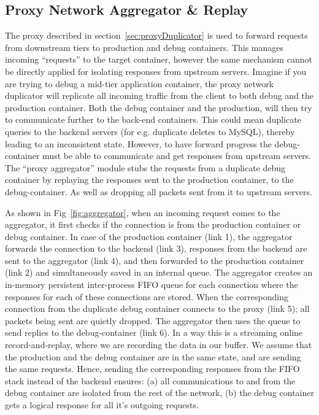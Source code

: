 

\subsection{Proxy Network Aggregator \& Replay }
\label{sec:proxyAggregator}
The proxy described in section~\ref{sec:proxyDuplicator} is used to forward requests from downstream tiers to production and debug containers.
This manages incoming ``requests'' to the target container, however the same mechanism cannot be directly applied for isolating responses from upstream servers.
Imagine if you are trying to debug a mid-tier application container, the proxy network duplicator will replicate all incoming traffic from the client to both debug and the production container. 
Both the debug container and the production, will then try to communicate further to the back-end containers.
This could mean duplicate queries to the backend servers (for e.g. duplicate deletes to MySQL), thereby leading to an inconsistent state.
However, to have forward progress the debug-container must be able to communicate and get responses from upstream servers.
The ``proxy aggregator'' module stubs the requests from a duplicate debug container by replaying the responses sent to the production container, to the debug-container.
As well as dropping all packets sent from it to upstream servers.

As shown in  Fig~\ref{fig:aggregator}, when an incoming request comes to the aggregator, it first checks if the connection is from the production container or debug container. 
In case of the production container (link 1), the aggregator forwards the connection to the backend (link 3), responses from the backend are sent to the aggregator (link 4), and then forwarded to the production container (link 2) and simultaneously saved in an internal queue.
The aggregator creates an in-memory persistent inter-process FIFO queue for each connection where the responses for each of these connections are stored.
When the corresponding connection from the duplicate debug container connects to the proxy (link 5); all packets being sent are quietly dropped. 
The aggregator then uses the queue to send replies to the debug-container (link 6).
In a way this is a streaming online record-and-replay, where we are recording the data in our buffer.
We assume that the production and the debug container are in the same state, and are sending the same requests. 
Hence, sending the corresponding responses from the FIFO stack instead of the backend ensures: (a) all communications to and from the debug container are isolated from the rest of the network, (b) the debug container gets a logical response for all it's outgoing requests.

